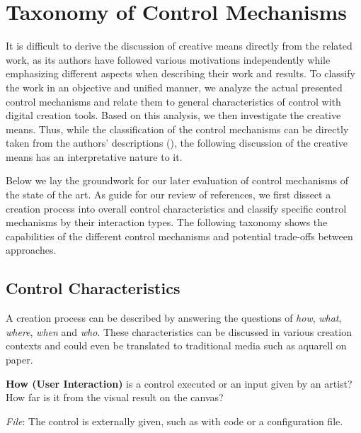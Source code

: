 

\section{Taxonomy of Control Mechanisms}\label{sec:taxo_control_mechanism}
It is difficult to derive the discussion of creative means directly from the related work, as its authors have followed various motivations independently while emphasizing different aspects when describing their work and results. To classify the work in an objective and unified manner, we analyze the actual presented control mechanisms and relate them to general characteristics of control with digital creation tools. Based on this analysis, we then investigate the creative means. Thus, while the classification of the control mechanisms can be directly taken from the authors' descriptions (), the following discussion of the creative means has an interpretative nature to it. 

Below we lay the groundwork for our later evaluation of control mechanisms of the state of the art. As guide for our review of references, we first dissect a creation process into overall control characteristics and classify specific control mechanisms by their interaction types. The following taxonomy shows the capabilities of the different control mechanisms and potential trade-offs between approaches.  

\newcommand{\controlParamsFigWidth}{0.9}

\subsection{Control Characteristics}\label{control_charateristics}
A creation process can be described by answering the questions of \textit{how}, \textit{what}, \textit{where}, \textit{when} and \textit{who}. These characteristics can be discussed in various creation contexts and could even be translated to traditional media such as aquarell on paper.


\noindent\textbf{How (User Interaction)} is a control executed or an input given by an artist? How far is it from the visual result on the canvas? 

\textit{File}: The control is externally given, such as with code or a configuration file.

